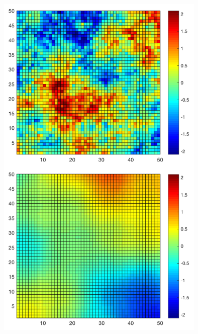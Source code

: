 \documentclass{beamer}
\begin{document}
\begin{frame}
\begin{columns}
\begin{column}{0.5\textwidth}
\begin{center}
     \includegraphics[width=0.75\textwidth]{Images/maternExample2.png} %
     \end{center}
\end{column}
\end{columns}

\end{frame}


\end{document}
